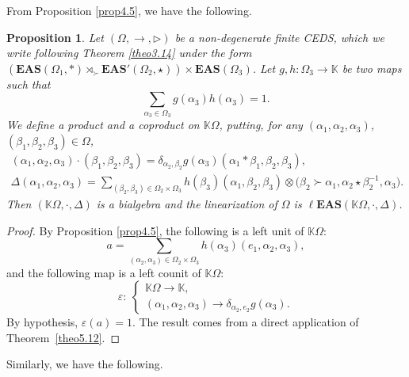 \documentclass[10pt,a4paper]{amsart}
\numberwithin{equation}{section}
\newtheorem{Proposition}[Theorem]{Proposition}
 { \theoremstyle{definition}
\newtheorem{Definition}[Theorem]{Definition}
\newtheorem{Note}[Theorem]{Note}
\newtheorem{Example}[Theorem]{Example}
\newtheorem{Remark}[Theorem]{Remark}
\newtheorem{Notation}[Theorem]{Notation}}
\newcommand{\eas}{\mathbf{EAS}}
\newcommand{\leas}{\ell\mathbf{EAS}}
\begin{document}
From Proposition \ref{prop4.5}, we have the following.

\begin{Proposition}
Let $(\Omega,\rightarrow,\triangleright)$ be a non-degenerate finite CEDS, which we write following Theorem {\rm\ref{theo3.14}} under the form
$(\eas(\Omega_1,*) \rtimes_\succ \eas'(\Omega_2,\star))\times \eas(\Omega_3)$.
Let $g,h\colon\Omega_3\longrightarrow \mathbb{K}$ be two maps such that
\[\sum_{\alpha_3\in \Omega_3} g(\alpha_3)h(\alpha_3)=1.\]
We define a product and a coproduct on $\mathbb{K}\Omega$, putting, for any $(\alpha_1,\alpha_2,\alpha_3)$, $(\beta_1,\beta_2,\beta_3)\in \Omega$,
\begin{gather*}
(\alpha_1,\alpha_2,\alpha_3)\cdot(\beta_1,\beta_2,\beta_3)=\delta_{\alpha_2,\beta_2}g(\alpha_3)(\alpha_1*\beta_1,\beta_2,\beta_3),\\
\Delta(\alpha_1,\alpha_2,\alpha_3)=\sum_{(\beta_2,\beta_3)\in \Omega_2\times \Omega_3}h(\beta_3)(\alpha_1,\beta_2,\beta_3)\otimes \bigl(\beta_2\succ \alpha_1,\alpha_2\star \beta_2^{-1},\alpha_3\bigr).
\end{gather*}
Then $(\mathbb{K}\Omega,\cdot,\Delta)$ is a bialgebra and the linearization of $\Omega$ is $\leas(\mathbb{K}\Omega,\cdot,\Delta)$.
\end{Proposition}

\begin{proof}
By Proposition \ref{prop4.5}, the following is a left unit of $\mathbb{K}\Omega$:
\[a=\sum_{(\alpha_2,\alpha_3)\in \Omega_2\times \Omega_3} h(\alpha_3)(e_1,\alpha_2,\alpha_3),\]
and the following map is a left counit of $\mathbb{K}\Omega$:
\[\varepsilon\colon \ \begin{cases}
\mathbb{K}\Omega \longrightarrow \mathbb{K},\\
(\alpha_1,\alpha_2,\alpha_3) \longrightarrow \delta_{\alpha_2,e_2}g(\alpha_3).
\end{cases}\]
By hypothesis, $\varepsilon(a)=1$. The result comes from a direct application of Theorem~\ref{theo5.12}.
\end{proof}

Similarly, we have the following.
\end{document}

